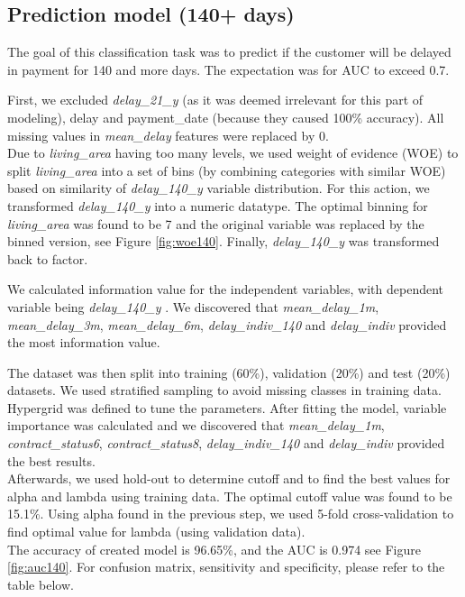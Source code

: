 \documentclass[
]{article}
\begin{document}
\hypertarget{prediction-model-140-days}{%
\subsection{Prediction model (140+ days)}\label{prediction-model-140-days}}

The goal of this classification task was to predict if the customer will be delayed in payment for 140 and more days. The expectation was for AUC to exceed 0.7.

First, we excluded \emph{delay\_21\_y} (as it was deemed irrelevant for this part of modeling), delay and payment\_date (because they caused 100\% accuracy). All missing values in \emph{mean\_delay} features were replaced by 0.\\
Due to \emph{living\_area} having too many levels, we used weight of evidence (WOE) to split \emph{living\_area} into a set of bins (by combining categories with similar WOE) based on similarity of \emph{delay\_140\_y} variable distribution. For this action, we transformed \emph{delay\_140\_y} into a numeric datatype. The optimal binning for \emph{living\_area} was found to be 7 and the original variable was replaced by the binned version, see Figure \ref{fig:woe140}. Finally, \emph{delay\_140\_y} was transformed back to factor.

We calculated information value for the independent variables, with dependent variable being \emph{delay\_140\_y} . We discovered that \emph{mean\_delay\_1m}, \emph{mean\_delay\_3m}, \emph{mean\_delay\_6m}, \emph{delay\_indiv\_140} and \emph{delay\_indiv} provided the most information value.

The dataset was then split into training (60\%), validation (20\%) and test (20\%) datasets. We used stratified sampling to avoid missing classes in training data.
Hypergrid was defined to tune the parameters. After fitting the model, variable importance was calculated and we discovered that \emph{mean\_delay\_1m}, \emph{contract\_status6}, \emph{contract\_status8}, \emph{delay\_indiv\_140} and \emph{delay\_indiv} provided the best results.\\
Afterwards, we used hold-out to determine cutoff and to find the best values for alpha and lambda using training data. The optimal cutoff value was found to be 15.1\%. Using alpha found in the previous step, we used 5-fold cross-validation to find optimal value for lambda (using validation data).\\
The accuracy of created model is 96.65\%, and the AUC is 0.974 see Figure \ref{fig:auc140}. For confusion matrix, sensitivity and specificity, please refer to the table below.
\end{document}
